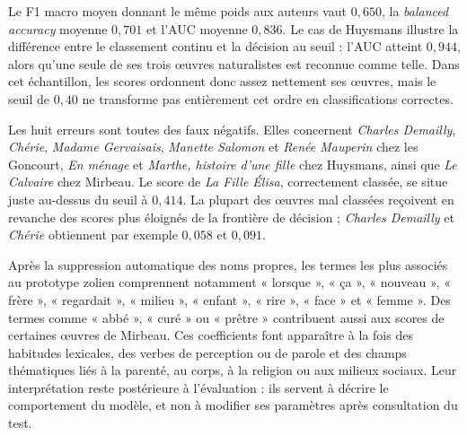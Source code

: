 Le F1 macro moyen donnant le même poids aux auteurs vaut $0{,}650$, la \textit{balanced accuracy} moyenne $0{,}701$ et l'AUC moyenne $0{,}836$. Le cas de Huysmans illustre la différence entre le classement continu et la décision au seuil : l'AUC atteint $0{,}944$, alors qu'une seule de ses trois œuvres naturalistes est reconnue comme telle. Dans cet échantillon, les scores ordonnent donc assez nettement ses œuvres, mais le seuil de $0{,}40$ ne transforme pas entièrement cet ordre en classifications correctes.

Les huit erreurs sont toutes des faux négatifs. Elles concernent \textit{Charles Demailly}, \textit{Chérie}, \textit{Madame Gervaisais}, \textit{Manette Salomon} et \textit{Renée Mauperin} chez les Goncourt, \textit{En ménage} et \textit{Marthe, histoire d'une fille} chez Huysmans, ainsi que \textit{Le Calvaire} chez Mirbeau. Le score de \textit{La Fille Élisa}, correctement classée, se situe juste au-dessus du seuil à $0{,}414$. La plupart des œuvres mal classées reçoivent en revanche des scores plus éloignés de la frontière de décision ; \textit{Charles Demailly} et \textit{Chérie} obtiennent par exemple $0{,}058$ et $0{,}091$.

Après la suppression automatique des noms propres, les termes les plus associés au prototype zolien comprennent notamment « lorsque », « ça », « nouveau », « frère », « regardait », « milieu », « enfant », « rire », « face » et « femme ». Des termes comme « abbé », « curé » ou « prêtre » contribuent aussi aux scores de certaines œuvres de Mirbeau. Ces coefficients font apparaître à la fois des habitudes lexicales, des verbes de perception ou de parole et des champs thématiques liés à la parenté, au corps, à la religion ou aux milieux sociaux. Leur interprétation reste postérieure à l'évaluation : ils servent à décrire le comportement du modèle, et non à modifier ses paramètres après consultation du test.
